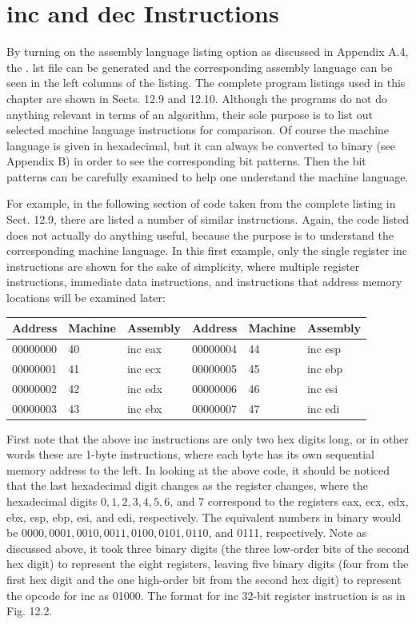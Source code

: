 \documentclass[10pt]{book}
\begin{document}
\section{inc and dec Instructions}
By turning on the assembly language listing option as discussed in Appendix A.4, the . lst file can be generated and the corresponding assembly language can be seen in the left columns of the listing. The complete program listings used in this chapter are shown in Sects. 12.9 and 12.10. Although the programs do not do anything relevant in terms of an algorithm, their sole purpose is to list out selected machine language instructions for comparison. Of course the machine language is given in hexadecimal, but it can always be converted to binary (see Appendix B) in order to see the corresponding bit patterns. Then the bit patterns can be carefully examined to help one understand the machine language.

For example, in the following section of code taken from the complete listing in Sect. 12.9, there are listed a number of similar instructions. Again, the code listed does not actually do anything useful, because the purpose is to understand the corresponding machine language. In this first example, only the single register inc instructions are shown for the sake of simplicity, where multiple register instructions, immediate data instructions, and instructions that address memory locations will be examined later:

\begin{center}
\begin{tabular}{|l|l|l|l|l|l|}
\hline
Address & Machine & Assembly & Address & Machine & Assembly \\
\hline
00000000 & 40 & inc eax & 00000004 & 44 & inc esp \\
\hline
00000001 & 41 & inc ecx & 00000005 & 45 & inc ebp \\
\hline
00000002 & 42 & inc edx & 00000006 & 46 & inc esi \\
\hline
00000003 & 43 & inc ebx & 00000007 & 47 & inc edi \\
\hline
\end{tabular}
\end{center}

First note that the above inc instructions are only two hex digits long, or in other words these are 1-byte instructions, where each byte has its own sequential memory address to the left. In looking at the above code, it should be noticed that the last hexadecimal digit changes as the register changes, where the hexadecimal digits $0,1,2,3,4,5,6$, and 7 correspond to the registers eax, ecx, edx, ebx, esp, ebp, esi, and edi, respectively. The equivalent numbers in binary would be $0000,0001,0010,0011,0100,0101,0110$, and 0111, respectively. Note as discussed above, it took three binary digits (the three low-order bits of the second hex digit) to represent the eight registers, leaving five binary digits (four from the first hex digit and the one high-order bit from the second hex digit) to represent the opcode for inc as 01000. The format for inc 32-bit register instruction is as in Fig. 12.2.
\end{document}
